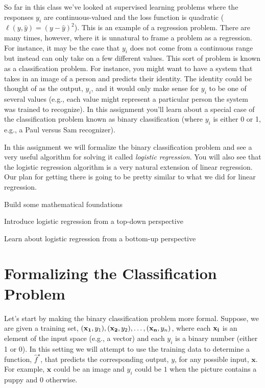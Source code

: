 \documentclass[assignment04_Solutions]{subfiles}
\begin{document}
So far in this class we've looked at supervised learning problems where the responses $y_i$ are continuous-valued and the loss function is quadratic ($\ell(y, \hat{y}) = (y-\hat{y})^2$).  This is an example of a regression problem.  There are many times, however, where it is unnatural to frame a problem as a regression.  For instance, it may be the case that $y_i$ does not come from a continuous range but instead can only take on a few different values.  This sort of problem is known as a classification problem.  For instance, you might want to have a system that takes in an image of a person and predicts their identity.  The identity could be thought of as the output, $y_i$, and it would only make sense for $y_i$ to be one of several values (e.g., each value might represent a particular person the system was trained to recognize).  In this assignment you'll learn about a special case of the classification problem known as binary classification (where $y_i$ is either 0 or 1, e.g., a Paul versus Sam recognizer).

In this assignment we will formalize the binary classification problem and see a very useful algorithm for solving it called \emph{logistic regression}.  You will also see that the logistic regression algorithm is a very natural extension of linear regression.  Our plan for getting there is going to be pretty similar to what we did for linear regression.
\bi
\item Build some mathematical foundations
\item Introduce logistic regression from a top-down perspective
\item Learn about logistic regression from a bottom-up perspective
\ei

\section{Formalizing the Classification Problem}
Let's start by making the binary classification problem more formal.  Suppose, we are given a training set, $(\mathbf{x_1}, y_1), (\mathbf{x_2}, y_2), \ldots, (\mathbf{x_n}, y_n)$, where each $\mathbf{x_i}$ is an element of the input space (e.g., a vector) and each $y_i$ is a binary number (either 1 or 0).  In this setting we will attempt to use the training data to determine a function, $\hat{f}^\star$, that predicts the corresponding output, $y$, for any possible input, $\mathbf{x}$.  For example,  $\mathbf{x}$ could be an image and $y_i$ could be $1$ when the picture contains a puppy and $0$ otherwise.
\end{document}
